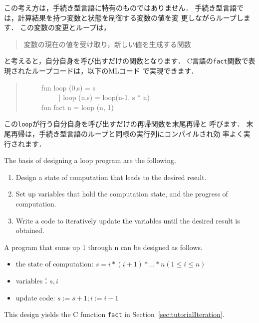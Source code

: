 \documentclass{jbook}
\newcommand{\myem}{\ \ \ \ \  }
\begin{document}
	この考え方は，手続き型言語に特有のものではありません．
	手続き型言語では，計算結果を持つ変数と状態を制御する変数の値を変
更しながらループします．
	この変数の変更とループは，
\begin{quote}
変数の現在の値を受け取り，新しい値を生成する関数
\end{quote}
と考えると，自分自身を呼び出すだけの関数となります．
	C言語の{\tt fact}関数で表現されたループコードは，以下のMLコード
で実現できます．
\begin{tt}
\begin{quote}
\myem  fun loop (0,s) = s\\
\myem \ \ \ \ \    | loop (n,s) = loop(n-1, s * n)\\
\myem fun fact n = loop (n, 1)
\end{quote}
\end{tt}
	この{\tt loop}が行う自分自身を呼び出すだけの再帰関数を末尾再帰と
呼びます．
	末尾再帰は，手続き型言語のループと同様の実行列にコンパイルされ効
率よく実行されます．
\else%
	
	The basis of designing a loop program are the following.
\begin{enumerate}
\item 
	Design a state of computation that leads to the desired result.
\item 
	Set up variables that hold the computation state, and the
progress of computation.
\item 	
	Write a code to iteratively update the variables until 
the desired result is obtained.
\end{enumerate}
	A program that sums up 1 through n can be designed as follows.
\begin{itemize}
\item 
the state of computation:
$s = i * (i + 1) * ... * n (1\le i\le n)$
\item 
variables：$s, i$
\item 
update code: $s := s + 1; i := i - 1$
\end{itemize}
This design yields the C function {\tt fact} in Section~\ref{sec:tutorialIteration}.
\end{document}
